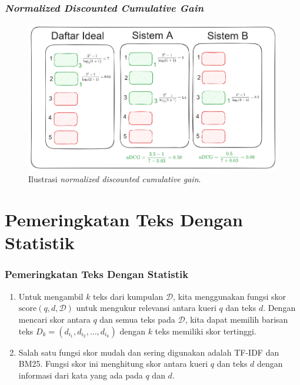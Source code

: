 \documentclass{beamer}
\newcommand{\f}[1]{\textit{#1}}
\begin{document}
\begin{frame}
    \frametitle{\f{Normalized Discounted Cumulative Gain}}
    \begin{figure}[!ht]
        \centering
        \includegraphics[width=1\textwidth]{assets/pics/contohnDCG.png}
        \caption{Ilustrasi \f{normalized discounted cumulative gain}.}
        \label{fig:ndcg}
    \end{figure}
\end{frame}

\section{Pemeringkatan Teks Dengan Statistik}

\begin{frame}
    \frametitle{{Pemeringkatan Teks Dengan Statistik}}

    \begin{enumerate}
        \item Untuk mengambil $k$ teks dari kumpulan $\mathcal{D}$, kita menggunakan fungsi skor $\text{score}(q, d, \mathcal{D})$ untuk mengukur relevansi antara kueri $q$ dan teks $d$. Dengan mencari skor antara $q$ dan semua teks pada $\mathcal{D}$, kita dapat memilih barisan teks $D_k = (d_{i_1}, d_{i_2},\dots, d_{i_k})$ dengan $k$ teks memiliki skor tertinggi.
        \item Salah satu fungsi skor mudah dan sering digunakan adalah TF-IDF dan BM25. Fungsi skor ini menghitung skor antara kueri $q$ dan teks $d$ dengan informasi dari kata yang ada pada $q$ dan $d$.
    \end{enumerate}
\end{frame}
\end{document}
